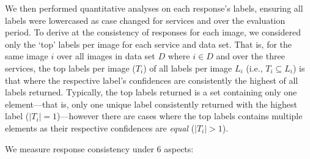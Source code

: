 We then performed quantitative analyses on each response's labels, ensuring all labels were lowercased as case changed for services \googleapi{} and \awsapi{} over the evaluation period. To derive at the consistency of responses for each image, we considered only the `top' labels per image for each service and data set. That is, for the same image $i$ over all images in data set $D$ where $i \in D$ and over the three services, the top labels per image ($T_{i}$) of all labels per image $L_{i}$ (i.e., $T_{i} \subseteq L_{i}$) is that where the respective label's confidences are consistently the highest of all labels returned. 
Typically, the top labels returned is a set containing only one element---that is, only one unique label consistently returned with the highest label ($| T_{i} | = 1$)---however there are cases where the top labels contains multiple elements as their respective confidences are \textit{equal} ($| T_{i} | > 1$).

We measure response consistency under 6 aspects:



